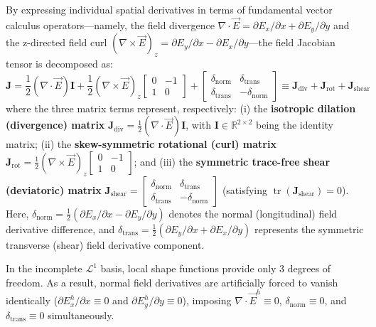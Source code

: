 \documentclass[preprint,12pt]{elsarticle}
\begin{document}
By expressing individual spatial derivatives in terms of fundamental vector calculus operators---namely, the field divergence $\nabla \cdot \vec{E} = \partial E_x/\partial x + \partial E_y/\partial y$ and the z-directed field curl $(\nabla \times \vec{E})_z = \partial E_y/\partial x - \partial E_x/\partial y$---the field Jacobian tensor is decomposed as:
\begin{equation}
    \mathbf{J} = \frac{1}{2}(\nabla \cdot \vec{E}) \mathbf{I} + \frac{1}{2}(\nabla \times \vec{E})_z \begin{bmatrix} 0 & -1 \\ 1 & 0 \end{bmatrix} + \begin{bmatrix} \delta_{\mathrm{norm}} & \delta_{\mathrm{trans}} \\ \delta_{\mathrm{trans}} & -\delta_{\mathrm{norm}} \end{bmatrix} \equiv \mathbf{J}_{\mathrm{div}} + \mathbf{J}_{\mathrm{rot}} + \mathbf{J}_{\mathrm{shear}}
    \label{eq:jacobian_tensor_EM_decomposition}
\end{equation}
where the three matrix terms represent, respectively: (i) the \textbf{isotropic dilation (divergence) matrix} $\mathbf{J}_{\mathrm{div}} = \frac{1}{2}(\nabla \cdot \vec{E}) \mathbf{I}$, with $\mathbf{I} \in \mathbb{R}^{2 \times 2}$ being the identity matrix; (ii) the \textbf{skew-symmetric rotational (curl) matrix} $\mathbf{J}_{\mathrm{rot}} = \frac{1}{2}(\nabla \times \vec{E})_z \begin{bmatrix} 0 & -1 \\ 1 & 0 \end{bmatrix}$; and (iii) the \textbf{symmetric trace-free shear (deviatoric) matrix} $\mathbf{J}_{\mathrm{shear}} = \begin{bmatrix} \delta_{\mathrm{norm}} & \delta_{\mathrm{trans}} \\ \delta_{\mathrm{trans}} & -\delta_{\mathrm{norm}} \end{bmatrix}$ (satisfying $\operatorname{tr}(\mathbf{J}_{\mathrm{shear}}) = 0$). Here, $\delta_{\mathrm{norm}} = \frac{1}{2}(\partial E_x/\partial x - \partial E_y/\partial y)$ denotes the normal (longitudinal) field derivative difference, and $\delta_{\mathrm{trans}} = \frac{1}{2}(\partial E_y/\partial x + \partial E_x/\partial y)$ represents the symmetric transverse (shear) field derivative component.

In the incomplete $\mathcal{L}^1$ basis, local shape functions provide only 3 degrees of freedom. As a result, normal field derivatives are artificially forced to vanish identically ($\partial E_x^h/\partial x \equiv 0$ and $\partial E_y^h/\partial y \equiv 0$), imposing $\nabla \cdot \vec{E}^h \equiv 0$, $\delta_{\mathrm{norm}} \equiv 0$, and $\delta_{\mathrm{trans}} \equiv 0$ simultaneously.
\end{document}
